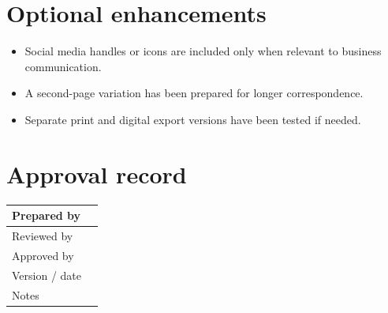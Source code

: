 \documentclass[11pt]{article}
\begin{document}
\section*{Optional enhancements}
\begin{itemize}
  \item Social media handles or icons are included only when relevant to business communication.
  \item A second-page variation has been prepared for longer correspondence.
  \item Separate print and digital export versions have been tested if needed.
\end{itemize}

\section*{Approval record}
\begin{tabularx}{\textwidth}{|p{}|X|}
\hline
Prepared by & \\
\hline
Reviewed by & \\
\hline
Approved by & \\
\hline
Version / date & \\
\hline
Notes & \\
\hline
\end{tabularx}
\end{document}
